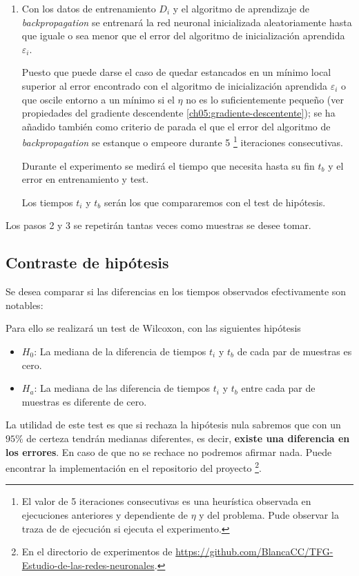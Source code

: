 \begin{enumerate}
\item Con los datos de entrenamiento $D_i$ y el algoritmo de 
aprendizaje de \textit{backpropagation} se entrenará la red 
neuronal inicializada aleatoriamente hasta que iguale o sea menor que  el 
error del algoritmo de inicialización aprendida $\varepsilon_i$. 

Puesto que puede darse el caso de 
quedar estancados en un mínimo local superior al error encontrado con el algoritmo de inicialización aprendida $\varepsilon_i$ o que oscile entorno a un 
mínimo si el $\eta$ no es lo suficientemente pequeño (ver 
propiedades del gradiente descendente \ref{ch05:gradiente-descentente}); se ha añadido también como criterio de parada el que el error del algoritmo de \textit{backpropagation}
se estanque o empeore durante 5 \footnote{El valor de 5 
iteraciones consecutivas es una heurística observada en 
ejecuciones anteriores y dependiente de $\eta$ y del problema.
Pude observar la traza de de ejecución si ejecuta el experimento.} 
iteraciones consecutivas. 

Durante el experimento se medirá el tiempo que necesita hasta su fin $t_b$ y el error en 
entrenamiento y test. 

Los tiempos $t_i$ y $t_b$ serán los que compararemos con el test de hipótesis. 
\end{enumerate}

Los pasos 2 y 3 se repetirán tantas veces como 
muestras se desee tomar. 

\subsection{Contraste de hipótesis}

Se desea comparar si las diferencias en los tiempos observados efectivamente son notables: 

Para ello se realizará un test de Wilcoxon, con las siguientes hipótesis

\begin{itemize}
    \item $H_0$: La mediana de la diferencia de tiempos  $t_i$ y $t_b$ de cada par de muestras es cero. 
    \item $H_a$: La mediana de las diferencia de tiempos  $t_i$ y $t_b$ entre cada par de muestras es diferente de cero. 
\end{itemize}

La utilidad de este test es que si rechaza la hipótesis nula sabremos que con un $95 \%$ de certeza tendrán medianas diferentes, es decir, \textbf{existe una 
diferencia en los errores}. En caso de que no se rechace no podremos afirmar nada.
Puede encontrar la implementación en el repositorio del
 proyecto \footnote{En el directorio de experimentos 
 de \url{https://github.com/BlancaCC/TFG-Estudio-de-las-redes-neuronales}.}.

